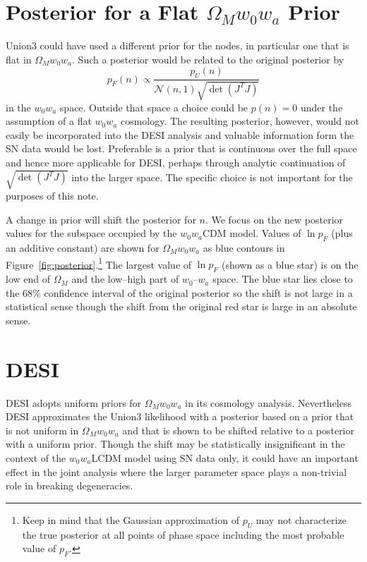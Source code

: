 \documentclass[11pt,a4paper]{article}
\begin{document}
\section{Posterior for a Flat  $\Omega_Mw_0w_a$  Prior}

Union3 could have used a different prior for the nodes, in particular one
that is flat in $\Omega_Mw_0w_a$.
Such a posterior would be related to the original posterior by
\begin{equation}
p_F(n) \propto \frac{p_U(n)}{\mathcal{N}(n,1)  \sqrt{\det{\left(J^T J\right)}}}
\end{equation}
in the $w_0w_a$ space.
Outside that space a choice could be $p(n)=0$ under the assumption
of a flat $w_0w_a$ cosmology.  The resulting posterior, however, would not easily be incorporated into the DESI analysis
and valuable information form the SN data would be lost.
Preferable is a prior that is continuous over the full space and hence more applicable for DESI,
perhaps through analytic continuation of $\sqrt{\det{\left(J^T J\right)}}$ into the larger space.
The specific choice is not important for the purposes of this note.

A change in prior will shift the posterior for $n$.   We focus on the new posterior values for the subspace occupied by
the $w_0w_a$CDM model.  Values of $\ln{p}_F$ (plus an additive constant)  are shown for $\Omega_Mw_0w_a$ as blue contours in Figure~\ref{fig:posterior}.\footnote{Keep in mind that the Gaussian approximation of $p_U$ may not characterize the true posterior at all points of
phase space including the most probable value of $p_F$.}
The largest value of $\ln{p}_F$ (shown as a blue star) is on the low end of $\Omega_M$ and the  low--high
part of $w_0$--$w_a$ space.
The blue star lies close to the 68\% confidence interval of the original posterior so the shift is not large in a statistical sense
though the shift from the original  red star is large in an absolute sense.

\section{DESI}
DESI  adopts uniform priors for $\Omega_Mw_0w_a$ in its cosmology analysis.
Nevertheless DESI approximates the Union3 likelihood with a posterior based on a prior that is not uniform in $\Omega_Mw_0w_a$
and that is shown to be shifted relative to a posterior with a uniform prior.
Though the shift may be statistically insignificant in the context of the $w_0w_a$LCDM model using SN data only,  it could have an important effect in the joint analysis
where the larger parameter space plays a non-trivial role in breaking degeneracies.
\end{document}
